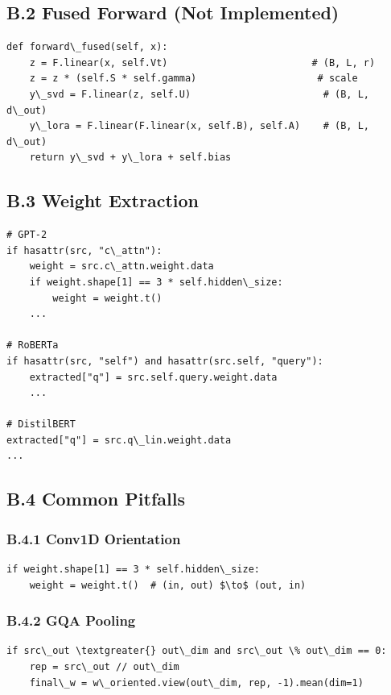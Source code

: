 \subsection{B.2 Fused Forward (Not Implemented)}

\begin{lstlisting}
def forward\_fused(self, x):
    z = F.linear(x, self.Vt)                         # (B, L, r)
    z = z * (self.S * self.gamma)                     # scale
    y\_svd = F.linear(z, self.U)                       # (B, L, d\_out)
    y\_lora = F.linear(F.linear(x, self.B), self.A)    # (B, L, d\_out)
    return y\_svd + y\_lora + self.bias
\end{lstlisting}

\subsection{B.3 Weight Extraction}

\begin{lstlisting}
# GPT-2
if hasattr(src, "c\_attn"):
    weight = src.c\_attn.weight.data
    if weight.shape[1] == 3 * self.hidden\_size:
        weight = weight.t()
    ...

# RoBERTa
if hasattr(src, "self") and hasattr(src.self, "query"):
    extracted["q"] = src.self.query.weight.data
    ...

# DistilBERT
extracted["q"] = src.q\_lin.weight.data
...
\end{lstlisting}

\subsection{B.4 Common Pitfalls}

\subsubsection{B.4.1 Conv1D Orientation}

\begin{lstlisting}
if weight.shape[1] == 3 * self.hidden\_size:
    weight = weight.t()  # (in, out) $\to$ (out, in)
\end{lstlisting}

\subsubsection{B.4.2 GQA Pooling}

\begin{lstlisting}
if src\_out \textgreater{} out\_dim and src\_out \% out\_dim == 0:
    rep = src\_out // out\_dim
    final\_w = w\_oriented.view(out\_dim, rep, -1).mean(dim=1)
\end{lstlisting}

